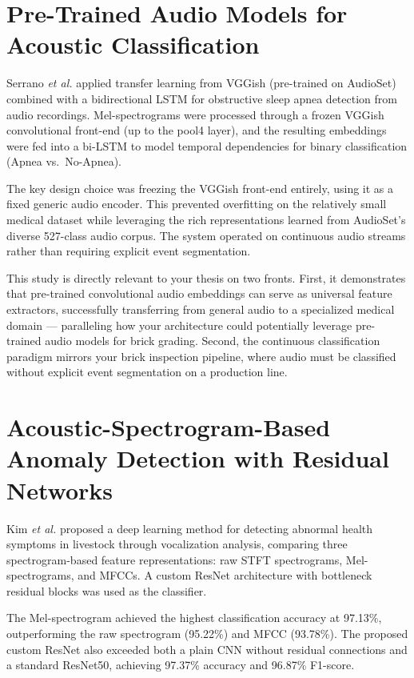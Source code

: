 \documentclass[12pt,a4paper,oneside]{report}
\begin{document}
\section{Pre-Trained Audio Models for Acoustic Classification}

Serrano \textit{et al.} \cite{serrano2024} applied transfer learning from VGGish (pre-trained on AudioSet) combined with a bidirectional LSTM for obstructive sleep apnea detection from audio recordings. Mel-spectrograms were processed through a frozen VGGish convolutional front-end (up to the pool4 layer), and the resulting embeddings were fed into a bi-LSTM to model temporal dependencies for binary classification (Apnea vs.\ No-Apnea).

The key design choice was freezing the VGGish front-end entirely, using it as a fixed generic audio encoder. This prevented overfitting on the relatively small medical dataset while leveraging the rich representations learned from AudioSet's diverse 527-class audio corpus. The system operated on continuous audio streams rather than requiring explicit event segmentation.

This study is directly relevant to your thesis on two fronts. First, it demonstrates that pre-trained convolutional audio embeddings can serve as universal feature extractors, successfully transferring from general audio to a specialized medical domain --- paralleling how your architecture could potentially leverage pre-trained audio models for brick grading. Second, the continuous classification paradigm mirrors your brick inspection pipeline, where audio must be classified without explicit event segmentation on a production line.

\section{Acoustic-Spectrogram-Based Anomaly Detection with Residual Networks}

Kim \textit{et al.} \cite{kim2025} proposed a deep learning method for detecting abnormal health symptoms in livestock through vocalization analysis, comparing three spectrogram-based feature representations: raw STFT spectrograms, Mel-spectrograms, and MFCCs. A custom ResNet architecture with bottleneck residual blocks was used as the classifier.

The Mel-spectrogram achieved the highest classification accuracy at 97.13\%, outperforming the raw spectrogram (95.22\%) and MFCC (93.78\%). The proposed custom ResNet also exceeded both a plain CNN without residual connections and a standard ResNet50, achieving 97.37\% accuracy and 96.87\% F1-score.
\end{document}
